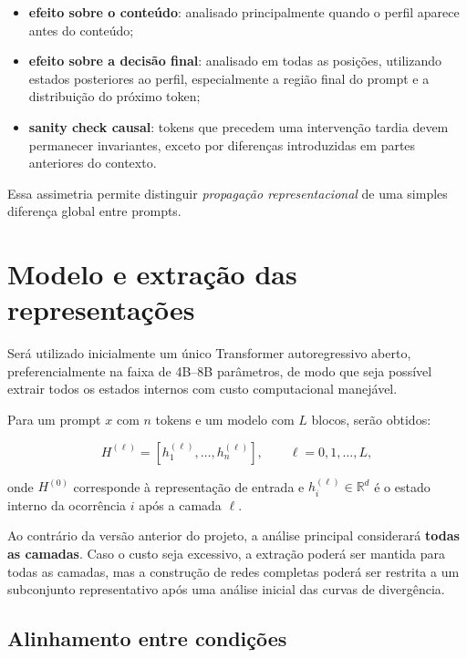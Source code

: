 \documentclass[11pt,a4paper]{article}
\begin{document}
\begin{itemize}
    \item \textbf{efeito sobre o conteúdo}: analisado principalmente quando o perfil aparece antes do conteúdo;
    \item \textbf{efeito sobre a decisão final}: analisado em todas as posições, utilizando estados posteriores ao perfil, especialmente a região final do prompt e a distribuição do próximo token;
    \item \textbf{sanity check causal}: tokens que precedem uma intervenção tardia devem permanecer invariantes, exceto por diferenças introduzidas em partes anteriores do contexto.
\end{itemize}

Essa assimetria permite distinguir \emph{propagação representacional} de uma simples diferença global entre prompts.

\section{Modelo e extração das representações}

Será utilizado inicialmente um único Transformer autoregressivo aberto, preferencialmente na faixa de 4B--8B parâmetros, de modo que seja possível extrair todos os estados internos com custo computacional manejável.

Para um prompt $x$ com $n$ tokens e um modelo com $L$ blocos, serão obtidos:

\[
H^{(\ell)} = \left[h_1^{(\ell)},\ldots,h_n^{(\ell)}\right],
\qquad \ell = 0,1,\ldots,L,
\]

onde $H^{(0)}$ corresponde à representação de entrada e $h_i^{(\ell)} \in \mathbb{R}^d$ é o estado interno da ocorrência $i$ após a camada $\ell$.

Ao contrário da versão anterior do projeto, a análise principal considerará \textbf{todas as camadas}. Caso o custo seja excessivo, a extração poderá ser mantida para todas as camadas, mas a construção de redes completas poderá ser restrita a um subconjunto representativo após uma análise inicial das curvas de divergência.

\subsection{Alinhamento entre condições}
\end{document}
